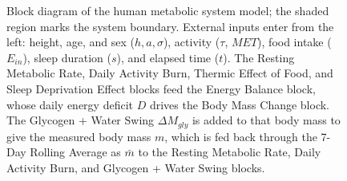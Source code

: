 \begin{figure}[htbp]
\begin{tikzpicture}
\end{tikzpicture}
\caption[Block diagram of the human metabolic system model.]{Block diagram of the human metabolic system model; the shaded region marks the system boundary. External inputs enter from the left: height, age, and sex ($h, a, \sigma$), activity ($\tau$, $MET$), food intake ($E_{in}$), sleep duration ($s$), and elapsed time ($t$). The Resting Metabolic Rate, Daily Activity Burn, Thermic Effect of Food, and Sleep Deprivation Effect blocks feed the Energy Balance block, whose daily energy deficit $D$ drives the Body Mass Change block. The Glycogen + Water Swing $\Delta M_{gly}$ is added to that body mass to give the measured body mass $m$, which is fed back through the 7-Day Rolling Average as $\bar{m}$ to the Resting Metabolic Rate, Daily Activity Burn, and Glycogen + Water Swing blocks.}
\label{fig_systemdiagram}
\end{figure}
